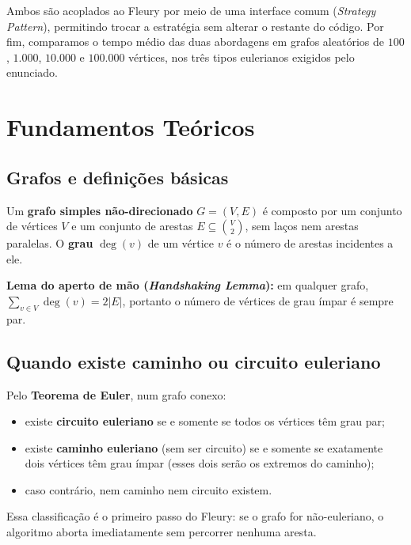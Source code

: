 \documentclass[12pt]{article}
\begin{document}
Ambos são acoplados ao Fleury por meio de uma interface comum
(\textit{Strategy Pattern}), permitindo trocar a estratégia sem alterar o
restante do código. Por fim, comparamos o tempo médio das duas abordagens em
grafos aleatórios de $100$, $1.000$, $10.000$ e $100.000$ vértices, nos três
tipos eulerianos exigidos pelo enunciado.

\section{Fundamentos Teóricos}

\subsection{Grafos e definições básicas}

Um \textbf{grafo simples não-direcionado} $G = (V, E)$ é composto por um
conjunto de vértices $V$ e um conjunto de arestas
$E \subseteq \binom{V}{2}$, sem laços nem arestas paralelas. O
\textbf{grau} $\deg(v)$ de um vértice $v$ é o número de arestas incidentes
a ele.

\textbf{Lema do aperto de mão (\textit{Handshaking Lemma}):} em qualquer
grafo, $\sum_{v \in V} \deg(v) = 2|E|$, portanto o número de vértices de
grau ímpar é sempre par.

\subsection{Quando existe caminho ou circuito euleriano}

Pelo \textbf{Teorema de Euler}, num grafo conexo:
\begin{itemize}
    \item existe \textbf{circuito euleriano} se e somente se todos os
          vértices têm grau par;
    \item existe \textbf{caminho euleriano} (sem ser circuito) se e somente
          se exatamente dois vértices têm grau ímpar (esses dois serão os
          extremos do caminho);
    \item caso contrário, nem caminho nem circuito existem.
\end{itemize}

Essa classificação é o primeiro passo do Fleury: se o grafo for
não-euleriano, o algoritmo aborta imediatamente sem percorrer nenhuma
aresta.
\end{document}
